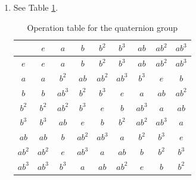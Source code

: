 \documentclass{article}
\begin{document}
\begin{enumerate}
        \item See Table \ref{tab:op-quaternion}.
            \begin{table}[]
                \centering
                \begin{tabular}{c|cccccccc}
                    & $e$    & $a$                       & $b$    & $b^2$  & $b^3$  & $ab$   & $ab^2$ & $ab^3$ \\ \hline
                $e$    & $e$    & $a$                       & $b$    & $b^2$  & $b^3$  & $ab$   & $ab^2$ & $ab^3$ \\
                $a$    & $a$    & $b^2$                     & $ab$   & $ab^2$ & $ab^3$ & $b^3$  & $e$    & $b$    \\
                $b$    & $b$    & $ab^3$                    & $b^2$  & $b^3$  & $e$    & $a$    & $ab$   & $ab^2$ \\
                $b^2$  & $b^2$  & $ab^2$                    & $b^3$  & $e$    & $b$    & $ab^3$ & $a$    & $ab$   \\
                $b^3$  & $b^3$  & $ab$                      & $e$    & $b$    & $b^2$  & $ab^2$ & $ab^3$ & $a$    \\
                $ab$   & $ab$   & $b$                       & $ab^2$ & $ab^3$ & $a$    & $b^2$  & $b^3$  & $e$    \\
                $ab^2$ & $ab^2$ & $e$                       & $ab^3$ & $a$    & $ab$   & $b$    & $b^2$  & $b^3$  \\
                $ab^3$ & $ab^3$ & $b^3$                     & $a$    & $ab$   & $ab^2$ & $e$    & $b$    & $b^2$ 
                \end{tabular}
                \caption{Operation table for the quaternion group}
                \label{tab:op-quaternion}
            \end{table}
        

\end{enumerate}
\end{document}
